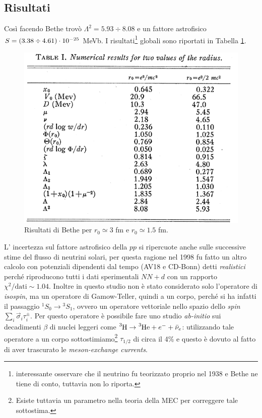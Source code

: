 \subsection{Risultati}
Così facendo Bethe trovò $\Lambda^2 = 5.93 \div 8.08 $ e un fattore astrofisico $S = ( 3.38 \div 4.61 )\cdot10^{-25}$ MeVb. I risultati\footnote{ interessante osservare che il neutrino fu teorizzato proprio nel 1938 e Bethe ne tiene di conto, tuttavia non lo riporta.} globali sono riportati in Tabella \ref{0331_tab}.
\begin{figure}[h]
    \centering
    \includegraphics*[scale=0.5]{Immagini/0331_Bethetab.png}
    \caption{Risultati di Bethe per $r_0 \simeq  3$ fm e $r_0 \simeq 1.5$ fm.}
    \label{0331_tab}
\end{figure}
\noindent L' incertezza sul fattore astrofisico della $pp$ si ripercuote anche sulle successive stime del flusso di neutrini solari, per questa ragione nel 1998 fu fatto un altro calcolo con potenziali dipendenti dal tempo (AV18 e CD-Bonn) detti \textit{realistici} perché riproducono tutti i dati sperimentali $NN + d$ con un rapporto $\chi^2/\text{dati}\sim 1.04$.
Inoltre in questo studio non è stato considerato solo l'operatore di \textit{isospin}, ma un operatore di Gamow-Teller, quindi a un corpo, perché si ha infatti il passaggio ${^1S_0} \to {^3S_1}$, ovvero un operatore vettoriale nello spazio dello \textit{spin} $\sum_i \vec{\sigma}_i \tau^\pm_i$. Per questo operatore è possibile fare uno studio \textit{ab-initio} sui decadimenti $\beta$ di nuclei leggeri come $\ce{^3H}\to\ce{^3He} +e^- + \bar{\nu}_e$: utilizzando tale operatore a un corpo sottostimiamo\footnote{Esiste tuttavia un parametro nella teoria della MEC per correggere tale sottostima.} $\tau_{1/2}$ di circa il 4\% e questo è dovuto al fatto di aver trascurato le \textit{meson-exchange currents}.
